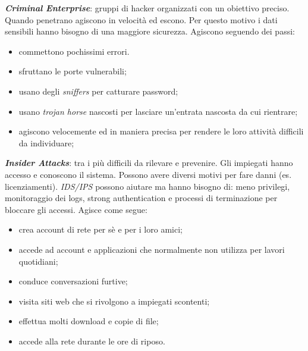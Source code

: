 \documentclass[11pt, a4paper, twoside, italian]{report}
\theoremstyle{plain}
\begin{document}
\noindent
\textit{\textbf{Criminal Enterprise}}: gruppi di hacker organizzati con un obiettivo preciso. Quando penetrano agiscono in velocità ed escono. Per questo motivo i dati sensibili hanno bisogno di una maggiore sicurezza. Agiscono seguendo dei passi:
\begin{multicols}{2}
	\begin{itemize}
		\item commettono pochissimi errori.
		\item sfruttano le porte vulnerabili;
		\item usano degli \textit{sniffers} per catturare password;
	\end{itemize}
\columnbreak
	\begin{itemize}
		\item usano \textit{trojan horse} nascosti per lasciare un'entrata nascosta da cui rientrare;
		\item agiscono velocemente ed in maniera precisa per rendere le loro attività difficili da individuare;
	\end{itemize}
\end{multicols}

\noindent
\textit{\textbf{Insider Attacks}}: tra i più difficili da rilevare e prevenire. Gli impiegati hanno accesso e conoscono il sistema. Possono avere diversi motivi per fare danni (es. licenziamenti). \textit{IDS/IPS} possono aiutare ma hanno bisogno di: meno privilegi, monitoraggio dei logs, strong authentication e processi di terminazione per bloccare gli accessi. Agisce come segue:
\begin{multicols}{2}
	\begin{itemize}
		\item crea account di rete per sè e per i loro amici;
		\item accede ad account e applicazioni che normalmente non utilizza per lavori quotidiani;
		\item conduce conversazioni furtive;
	\end{itemize}
\columnbreak
	\begin{itemize}
		\item visita siti web che si rivolgono a impiegati scontenti;
		\item effettua molti download e copie di file;
		\item accede alla rete durante le ore di riposo.
	\end{itemize}
\end{multicols}
\end{document}
